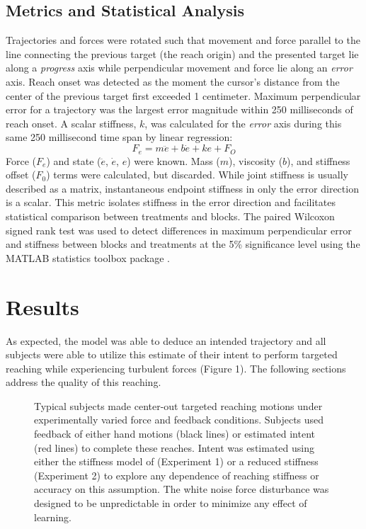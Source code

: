 \documentclass{frontiersSCNS} %
\begin{document}
\begin{methods}
\subsection{Metrics and Statistical Analysis}
Trajectories and forces were rotated such that movement and force parallel to the line connecting the previous target (the reach origin) and the presented target lie along a \textit{progress} axis while perpendicular movement and force lie along an \textit{error} axis. Reach onset was detected as the moment the cursor's distance from the center of the previous target first exceeded 1 centimeter. Maximum perpendicular error for a trajectory was the largest error magnitude within 250 milliseconds of reach onset. A scalar stiffness, $k$, was calculated for the \textit{error} axis during this same 250 millisecond time span by linear regression:
\begin{equation}
F_e=m\ddot{e}+b\dot{e}+ke+F_O
\end{equation}
Force ($F_e$) and state ($\ddot{e}$, $\dot{e}$, $e$) were known. Mass ($m$), viscosity ($b$), and stiffness offset ($F_0$) terms were calculated, but discarded. While joint stiffness is usually described as a matrix, instantaneous endpoint stiffness in only the error direction is a scalar. This metric isolates stiffness in the error direction and facilitates statistical comparison between treatments and blocks. The paired Wilcoxon signed rank test was used to detect differences in maximum perpendicular error and stiffness between blocks and treatments at the 5\% significance level using the MATLAB statistics toolbox package \cite{MATLAB:2014}.
\end{methods}


\section{Results}
As expected, the model was able to deduce an intended trajectory and all subjects were able to utilize this estimate of their intent to perform targeted reaching while experiencing turbulent forces (Figure 1). The following sections address the quality of this reaching.

\begin{figure}[h]
\centering
{}
\caption{Typical subjects made center-out targeted reaching motions under experimentally varied force and feedback conditions. Subjects used feedback of either hand motions (black lines) or estimated intent (red lines) to complete these reaches. Intent was estimated using either the stiffness model of \cite{shadmehr1994adaptive} (Experiment 1) or a reduced stiffness (Experiment 2) to explore any dependence of reaching stiffness or accuracy on this assumption. The white noise force disturbance was designed to be unpredictable in order to minimize any effect of learning.}
\label{Yplots}
\end{figure}
\end{document}
